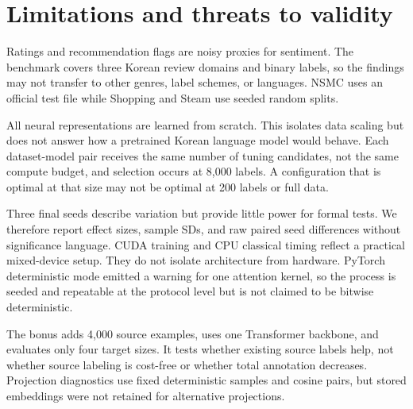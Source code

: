 \section{Limitations and threats to validity}

Ratings and recommendation flags are noisy proxies for sentiment. The benchmark covers three Korean review domains and binary labels, so the findings may not transfer to other genres, label schemes, or languages. NSMC uses an official test file while Shopping and Steam use seeded random splits.

All neural representations are learned from scratch. This isolates data scaling but does not answer how a pretrained Korean language model would behave. Each dataset-model pair receives the same number of tuning candidates, not the same compute budget, and selection occurs at 8,000 labels. A configuration that is optimal at that size may not be optimal at 200 labels or full data.

Three final seeds describe variation but provide little power for formal tests. We therefore report effect sizes, sample SDs, and raw paired seed differences without significance language. CUDA training and CPU classical timing reflect a practical mixed-device setup. They do not isolate architecture from hardware. PyTorch deterministic mode emitted a warning for one attention kernel, so the process is seeded and repeatable at the protocol level but is not claimed to be bitwise deterministic.

The bonus adds 4,000 source examples, uses one Transformer backbone, and evaluates only four target sizes. It tests whether existing source labels help, not whether source labeling is cost-free or whether total annotation decreases. Projection diagnostics use fixed deterministic samples and cosine pairs, but stored embeddings were not retained for alternative projections.
